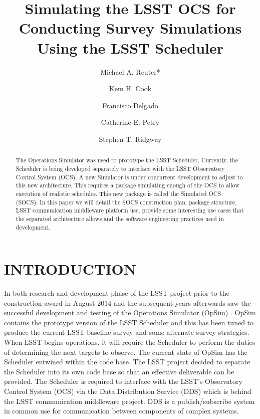 \documentclass[]{spie}  %
\title{Simulating the LSST OCS for Conducting Survey Simulations Using the LSST Scheduler}
\author[a]{Michael A. Reuter*}
\author[b]{Kem H. Cook}
\author[a]{Francisco Delgado}
\author[a]{Catherine E. Petry}
\author[c]{Stephen T. Ridgway}
\affil[a]{LSST, 950 N Cherry Ave, Tucson, AZ USA}
\affil[b]{Cook Astronomical Consulting, San Ramone, CA USA}
\affil[c]{National Optical Astronomy Observatory, 950 N Cherry Ave, Tucson, AZ USA}
\begin{document}
 
\maketitle

\begin{abstract}
The Operations Simulator was used to prototype the LSST Scheduler. Currently, the Scheduler is being developed separately to interface with the LSST Observatory Control System (OCS).  A new Simulator is under concurrent development to adjust to this new architecture.  This requires a package simulating enough of the OCS to allow execution of realistic schedules. This new package is called the Simulated OCS (SOCS). In this paper we will detail the SOCS construction plan, package structure, LSST communication middleware platform use, provide some interesting use cases that the separated architecture allows and the software engineering practices used in development.
\end{abstract}


\section{INTRODUCTION}
\label{sec:intro}  %

In both research and development phase of the LSST project prior to the construction award in August 2014 and the subsequent years afterwards saw the successful development and testing of the Operations Simulator (OpSim) \cite{2014SPIE.9149E..0GD}\cite{2014SPIE.9150E..15D}\cite{2013AAS...22124703S}\cite{2010SPIE.7737E..0ZR}\cite{2010AAS...21540105K}\cite{2009AAS...21346004C}\cite{2007AAS...21113703P}\cite{2006SPIE.6270E..1DD}\cite{2006AAS...209.8604P}\cite{2005AAS...207.2626C}\cite{2004AAS...20510809C} . OpSim contains the prototype version of the LSST Scheduler and this has been tuned to produce the current LSST baseline survey and  some alternate survey strategies\cite{Cook_SPIE2016}. When LSST begins operations, it will require the Scheduler to perform the duties of determining the next targets to observe. The current state of OpSim has the Scheduler entwined within the code base. The LSST project decided to separate the Scheduler\cite{Delgado_SPIE2016} into its own code base so that an effective deliverable can be provided. The Scheduler is required to interface with the LSST's Observatory Control System (OCS)\cite{Daly_SPIE2016} via the Data Distribution Service (DDS) which is behind the LSST communication middleware\cite{Mills_SPIE2016} project. DDS is a publish/subscribe system in common use for communication between components of complex systems. 
\end{document}
